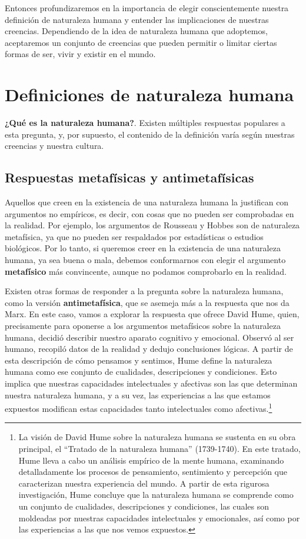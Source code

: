 \documentclass[
  jou,
  floatsintext,
  longtable,
  a4paper,
  nolmodern,
  notxfonts,
  notimes,
  12pt,
  colorlinks=true,linkcolor=blue,citecolor=blue,urlcolor=blue]{apa7}
\begin{document}
Entonces profundizaremos en la importancia de elegir conscientemente
nuestra definición de naturaleza humana y entender las implicaciones de
nuestras creencias. Dependiendo de la idea de naturaleza humana que
adoptemos, aceptaremos un conjunto de creencias que pueden permitir o
limitar ciertas formas de ser, vivir y existir en el mundo.

\section{Definiciones de naturaleza
humana}\label{definiciones-de-naturaleza-humana}

\textbf{¿Qué es la naturaleza humana?}. Existen múltiples respuestas
populares a esta pregunta, y, por supuesto, el contenido de la
definición varía según nuestras creencias y nuestra cultura.

\subsection{Respuestas metafísicas y
antimetafísicas}\label{respuestas-metafuxedsicas-y-antimetafuxedsicas}

Aquellos que creen en la existencia de una naturaleza humana la
justifican con argumentos no empíricos, es decir, con cosas que no
pueden ser comprobadas en la realidad. Por ejemplo, los argumentos de
Rousseau y Hobbes son de naturaleza metafísica, ya que no pueden ser
respaldados por estadísticas o estudios biológicos. Por lo tanto, si
queremos creer en la existencia de una naturaleza humana, ya sea buena o
mala, debemos conformarnos con elegir el argumento \textbf{metafísico}
más convincente, aunque no podamos comprobarlo en la realidad.

Existen otras formas de responder a la pregunta sobre la naturaleza
humana, como la versión \textbf{antimetafísica}, que se asemeja más a la
respuesta que nos da Marx. En este caso, vamos a explorar la respuesta
que ofrece David Hume, quien, precisamente para oponerse a los
argumentos metafísicos sobre la naturaleza humana, decidió describir
nuestro aparato cognitivo y emocional. Observó al ser humano, recopiló
datos de la realidad y dedujo conclusiones lógicas. A partir de esta
descripción de cómo pensamos y sentimos, Hume define la naturaleza
humana como ese conjunto de cualidades, descripciones y condiciones.
Esto implica que nuestras capacidades intelectuales y afectivas son las
que determinan nuestra naturaleza humana, y a su vez, las experiencias a
las que estamos expuestos modifican estas capacidades tanto
intelectuales como afectivas.\footnote{La visión de David Hume sobre la
  naturaleza humana se sustenta en su obra principal, el ``Tratado de la
  naturaleza humana'' (1739-1740). En este tratado, Hume lleva a cabo un
  análisis empírico de la mente humana, examinando detalladamente los
  procesos de pensamiento, sentimiento y percepción que caracterizan
  nuestra experiencia del mundo. A partir de esta rigurosa
  investigación, Hume concluye que la naturaleza humana se comprende
  como un conjunto de cualidades, descripciones y condiciones, las
  cuales son moldeadas por nuestras capacidades intelectuales y
  emocionales, así como por las experiencias a las que nos vemos
  expuestos.}
\end{document}
